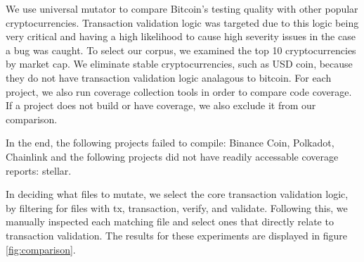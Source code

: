 We use universal mutator to compare Bitcoin's testing quality with other popular cryptocurrencies. Transaction validation logic was targeted
due to this logic being very critical and having a high likelihood to cause high severity issues in the case a bug was caught. To select
our corpus, we examined the top 10 cryptocurrencies by market cap. We eliminate stable cryptocurrencies, such as USD coin,
because they do not have transaction validation logic analagous to bitcoin. For each project, we also run coverage collection
tools in order to compare code coverage. If a project does not build or have coverage, we also exclude it from our comparison.

In the end, the following projects failed to compile: Binance Coin, Polkadot, Chainlink and the following projects did not have
readily accessable coverage reports: stellar.

In deciding what files to mutate, we select the core transaction validation logic, by filtering for files
with tx, transaction, verify, and validate. Following this, we manually inspected each matching file and select
ones that directly relate to transaction validation. The results for these experiments are displayed in figure \ref{fig:comparison}.